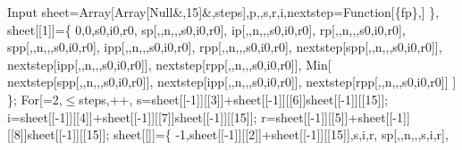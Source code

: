 \documentclass{article}
\begin{document}
\begin{appendix}
\begin{mmaCell}[moredefined={sp, ip, rp, spp, ipp, rpp, eulerImpMSIRNVD},morepattern={n_, s_, i_, r_, n, steps_, s0_, i0_, r0_, c_, steps, fp, c, s0, i0, r0, \#},morelocal={i, s, r, sheet, p, nextstep}]{Input}
        sheet=Array[Array[Null&,15]&,steps],p,\mmaLoc{\(\pmb{\iota}\)},s,r,i,nextstep=Function[\{fp\},]
    \},
    sheet[[1]]=\{
        0,0,s0,i0,r0,
        sp[\mmaPat{\(\pmb{\beta}\)},\mmaPat{\(\pmb{\gamma}\)},n,\mmaPat{\(\pmb{\mu}\)},\mmaPat{\(\pmb{\nu}\)},s0,i0,r0],
        ip[\mmaPat{\(\pmb{\beta}\)},\mmaPat{\(\pmb{\gamma}\)},n,\mmaPat{\(\pmb{\mu}\)},\mmaPat{\(\pmb{\nu}\)},s0,i0,r0],
        rp[\mmaPat{\(\pmb{\beta}\)},\mmaPat{\(\pmb{\gamma}\)},n,\mmaPat{\(\pmb{\mu}\)},\mmaPat{\(\pmb{\nu}\)},s0,i0,r0],
        spp[\mmaPat{\(\pmb{\beta}\)},\mmaPat{\(\pmb{\gamma}\)},n,\mmaPat{\(\pmb{\mu}\)},\mmaPat{\(\pmb{\nu}\)},s0,i0,r0],
        ipp[\mmaPat{\(\pmb{\beta}\)},\mmaPat{\(\pmb{\gamma}\)},n,\mmaPat{\(\pmb{\mu}\)},\mmaPat{\(\pmb{\nu}\)},s0,i0,r0],
        rpp[\mmaPat{\(\pmb{\beta}\)},\mmaPat{\(\pmb{\gamma}\)},n,\mmaPat{\(\pmb{\mu}\)},\mmaPat{\(\pmb{\nu}\)},s0,i0,r0],
        nextstep[spp[\mmaPat{\(\pmb{\beta}\)},\mmaPat{\(\pmb{\gamma}\)},n,\mmaPat{\(\pmb{\mu}\)},\mmaPat{\(\pmb{\nu}\)},s0,i0,r0]],
        nextstep[ipp[\mmaPat{\(\pmb{\beta}\)},\mmaPat{\(\pmb{\gamma}\)},n,\mmaPat{\(\pmb{\mu}\)},\mmaPat{\(\pmb{\nu}\)},s0,i0,r0]],
        nextstep[rpp[\mmaPat{\(\pmb{\beta}\)},\mmaPat{\(\pmb{\gamma}\)},n,\mmaPat{\(\pmb{\mu}\)},\mmaPat{\(\pmb{\nu}\)},s0,i0,r0]],
        Min[
            nextstep[spp[\mmaPat{\(\pmb{\beta}\)},\mmaPat{\(\pmb{\gamma}\)},n,\mmaPat{\(\pmb{\mu}\)},\mmaPat{\(\pmb{\nu}\)},s0,i0,r0]],
            nextstep[ipp[\mmaPat{\(\pmb{\beta}\)},\mmaPat{\(\pmb{\gamma}\)},n,\mmaPat{\(\pmb{\mu}\)},\mmaPat{\(\pmb{\nu}\)},s0,i0,r0]],
            nextstep[rpp[\mmaPat{\(\pmb{\beta}\)},\mmaPat{\(\pmb{\gamma}\)},n,\mmaPat{\(\pmb{\mu}\)},\mmaPat{\(\pmb{\nu}\)},s0,i0,r0]]
        ]
    \};
    For[\mmaLoc{\(\pmb{\iota}\)}=2,\mmaLoc{\(\pmb{\iota}\)}\(\pmb{\leq}\)steps,\mmaLoc{\(\pmb{\iota}\)}++,
        s=sheet[[\mmaLoc{\(\pmb{\iota}\)}-1]][[3]]+sheet[[\mmaLoc{\(\pmb{\iota}\)}-1]][[6]]sheet[[\mmaLoc{\(\pmb{\iota}\)}-1]][[15]];
        i=sheet[[\mmaLoc{\(\pmb{\iota}\)}-1]][[4]]+sheet[[\mmaLoc{\(\pmb{\iota}\)}-1]][[7]]sheet[[\mmaLoc{\(\pmb{\iota}\)}-1]][[15]];
        r=sheet[[\mmaLoc{\(\pmb{\iota}\)}-1]][[5]]+sheet[[\mmaLoc{\(\pmb{\iota}\)}-1]][[8]]sheet[[\mmaLoc{\(\pmb{\iota}\)}-1]][[15]];
        sheet[[\mmaLoc{\(\pmb{\iota}\)}]]=\{
            \mmaLoc{\(\pmb{\iota}\)}-1,sheet[[\mmaLoc{\(\pmb{\iota}\)}-1]][[2]]+sheet[[\mmaLoc{\(\pmb{\iota}\)}-1]][[15]],s,i,r,
            sp[\mmaPat{\(\pmb{\beta}\)},\mmaPat{\(\pmb{\gamma}\)},n,\mmaPat{\(\pmb{\mu}\)},\mmaPat{\(\pmb{\nu}\)},s,i,r],

\end{mmaCell}
\end{appendix}
\end{document}

